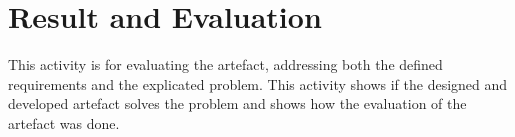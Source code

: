 \chapter{Result and Evaluation}
This activity is for evaluating the artefact, addressing both the defined requirements and the explicated problem. This activity shows if the designed and developed artefact solves the problem and shows how the evaluation of the artefact was done. 

%
%


